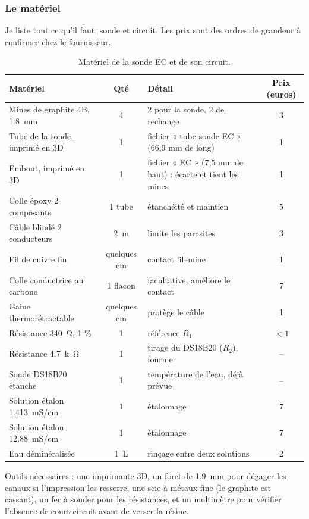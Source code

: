 \subsubsection*{Le matériel}

Je liste tout ce qu'il faut, sonde et circuit. Les prix sont des ordres de grandeur à confirmer chez le fournisseur.

\begin{table}[H]
\centering
\small
\begin{tabularx}{\textwidth}{|l|c|Y|c|}
\hline
\textbf{Matériel} & \textbf{Qté} & \textbf{Détail} & \textbf{Prix (euros)} \\
\hline
Mines de graphite 4B, \qty{1,8}{mm} & 4 & 2 pour la sonde, 2 de rechange & 3 \\
\hline
Tube de la sonde, imprimé en 3D & 1 & fichier « tube sonde EC » (66,9 mm de long) & 1 \\
\hline
Embout, imprimé en 3D & 1 & fichier « EC » (7,5 mm de haut) : écarte et tient les mines & 1 \\
\hline
Colle époxy 2 composants & 1 tube & étanchéité et maintien & 5 \\
\hline
Câble blindé 2 conducteurs & \qty{2}{m} & limite les parasites & 3 \\
\hline
Fil de cuivre fin & quelques cm & contact fil--mine & 1 \\
\hline
Colle conductrice au carbone & 1 flacon & facultative, améliore le contact & 7 \\
\hline
Gaine thermorétractable & quelques cm & protège le câble & 1 \\
\hline
Résistance \qty{340}{\ohm}, 1 \% & 1 & référence $R_1$ & $<1$ \\
\hline
Résistance \qty{4,7}{k\ohm} & 1 & tirage du DS18B20 ($R_2$), fournie & -- \\
\hline
Sonde DS18B20 étanche & 1 & température de l'eau, déjà prévue & -- \\
\hline
Solution étalon \qty{1,413}{mS/cm} & 1 & étalonnage & 7 \\
\hline
Solution étalon \qty{12,88}{mS/cm} & 1 & étalonnage & 7 \\
\hline
Eau déminéralisée & \qty{1}{L} & rinçage entre deux solutions & 2 \\
\hline
\end{tabularx}
\caption{Matériel de la sonde EC et de son circuit.}
\end{table}

Outils nécessaires : une imprimante 3D, un foret de \qty{1,9}{mm} pour dégager les canaux si l'impression les resserre, une scie à métaux fine (le graphite est cassant), un fer à souder pour les résistances, et un multimètre pour vérifier l'absence de court-circuit avant de verser la résine.

